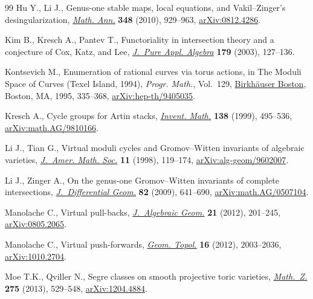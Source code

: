 \documentclass[pdftex]{sigma}
\numberwithin{equation}{section}
\begin{document}
\begin{thebibliography}{99}
Hu Y., Li J., Genus-one stable maps, local equations, and {V}akil--{Z}inger's
 desingularization, \href{https://doi.org/10.1007/s00208-010-0504-8}{\textit{Math. Ann.}} \textbf{348} (2010), 929--963,
 \href{https://arxiv.org/abs/0812.4286}{arXiv:0812.4286}.

Kim B., Kresch A., Pantev T., Functoriality in intersection theory and a
 conjecture of {C}ox, {K}atz, and {L}ee, \href{https://doi.org/10.1016/S0022-4049(02)00293-1}{\textit{J.~Pure Appl. Algebra}}
 \textbf{179} (2003), 127--136.

Kontsevich M., Enumeration of rational curves via torus actions, in The Moduli
 Space of Curves ({T}exel {I}sland, 1994), \textit{Progr. Math.}, Vol.~129,
 \href{https://doi.org/10.1007/978-1-4612-4264-2_12}{Birkh\"{a}user Boston}, Boston, MA, 1995, 335--368, \href{https://arxiv.org/abs/hep-th/9405035}{arXiv:hep-th/9405035}.

Kresch A., Cycle groups for {A}rtin stacks, \href{https://doi.org/10.1007/s002220050351}{\textit{Invent. Math.}} \textbf{138} (1999), 495--536, \href{https://arxiv.org/abs/math.AG/9810166}{arXiv:math.AG/9810166}.

Li J., Tian G., Virtual moduli cycles and {G}romov--{W}itten invariants of
 algebraic varieties, \href{https://doi.org/10.1090/S0894-0347-98-00250-1}{\textit{J.~Amer. Math. Soc.}} \textbf{11} (1998),
 119--174, \href{https://arxiv.org/abs/alg-geom/9602007}{arXiv:alg-geom/9602007}.

Li J., Zinger A., On the genus-one {G}romov--{W}itten invariants of complete
 intersections, \href{https://doi.org/10.4310/jdg/1251122549}{\textit{J.~Differential Geom.}} \textbf{82} (2009), 641--690, \href{https://arxiv.org/abs/math.AG/0507104}{arXiv:math.AG/0507104}.

Manolache C., Virtual pull-backs, \href{https://doi.org/10.1090/S1056-3911-2011-00606-1}{\textit{J.~Algebraic Geom.}} \textbf{21}
 (2012), 201--245, \href{https://arxiv.org/abs/0805.2065}{arXiv:0805.2065}.

Manolache C., Virtual push-forwards, \href{https://doi.org/10.2140/gt.2012.16.2003}{\textit{Geom. Topol.}} \textbf{16} (2012),
 2003--2036, \href{https://arxiv.org/abs/1010.2704}{arXiv:1010.2704}.

Moe T.K., Qviller N., Segre classes on smooth projective toric varieties,
 \href{https://doi.org/10.1007/s00209-013-1146-9}{\textit{Math.~Z.}} \textbf{275} (2013), 529--548, \href{https://arxiv.org/abs/1204.4884}{arXiv:1204.4884}.


\end{thebibliography}
\end{document}
